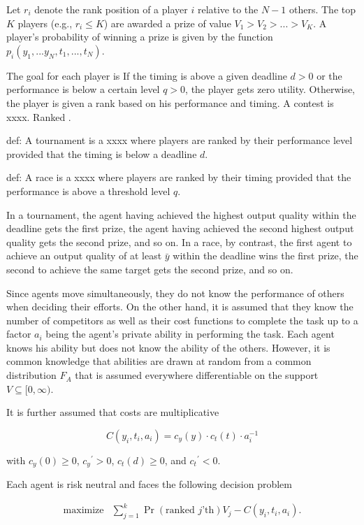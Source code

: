 \documentclass[12pt,]{article}
\begin{document}
Let \(r_i\) denote the rank position of a player \(i\) relative to the
\(N-1\) others. The top \(K\) players (e.g., \(r_i\leq K\)) are awarded
a prize of value \(V_1 > V_2 > ... > V_K\). A player's probability of
winning a prize is given by the function
\(p_i(y_1,...y_N, t_1, ..., t_N)\).

The goal for each player is If the timing is above a given deadline
\(d>0\) or the performance is below a certain level \(q>0\), the player
gets zero utility. Otherwise, the player is given a rank based on his
performance and timing. A contest is xxxx. Ranked .

def: A tournament is a xxxx where players are ranked by their
performance level provided that the timing is below a deadline \(d\).

def: A race is a xxxx where players are ranked by their timing provided
that the performance is above a threshold level \(q\).

In a tournament, the agent having achieved the highest output quality
within the deadline gets the first prize, the agent having achieved the
second highest output quality gets the second prize, and so on. In a
race, by contrast, the first agent to achieve an output quality of at
least \({\bar y}\) within the deadline wins the first prize, the second
to achieve the same target gets the second prize, and so on.

Since agents move simultaneously, they do not know the performance of
others when deciding their efforts. On the other hand, it is assumed
that they know the number of competitors as well as their cost functions
to complete the task up to a factor \(a_i\) being the agent's private
ability in performing the task. Each agent knows his ability but does
not know the ability of the others. However, it is common knowledge that
abilities are drawn at random from a common distribution \(F_A\) that is
assumed everywhere differentiable on the support
\(V\subseteq [0, \infty)\).

It is further assumed that costs are multiplicative

\[C(y_i, t_i, a_i) = {c_{y}}(y) \cdot {c_{t}}(t)  \cdot a_i^{-1}\]

with \({c_{y}}(0)\geq 0\), \({c_{y}}^\prime>0\), \({c_{t}}(d)\geq 0\),
and \({c_{t}}^\prime<0\).

Each agent is risk neutral and faces the following decision problem

\[\begin{array}{ll}
    \mbox{maximize} & \sum_{j=1}^k \Pr(\text{ranked $j$'th}) V_j  - C(y_i, t_i, a_i).
  \end{array}\]
\end{document}

